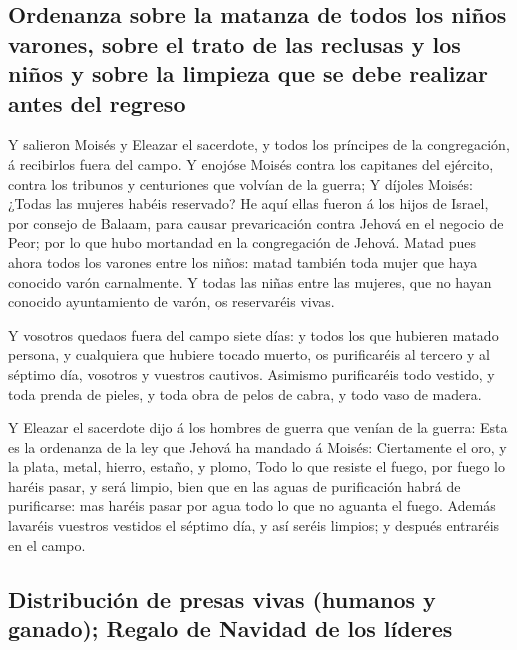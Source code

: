 \hypertarget{ordenanza-sobre-la-matanza-de-todos-los-niuxf1os-varones-sobre-el-trato-de-las-reclusas-y-los-niuxf1os-y-sobre-la-limpieza-que-se-debe-realizar-antes-del-regreso}{%
\subsection{Ordenanza sobre la matanza de todos los niños varones, sobre
el trato de las reclusas y los niños y sobre la limpieza que se debe
realizar antes del
regreso}\label{ordenanza-sobre-la-matanza-de-todos-los-niuxf1os-varones-sobre-el-trato-de-las-reclusas-y-los-niuxf1os-y-sobre-la-limpieza-que-se-debe-realizar-antes-del-regreso}}

 Y salieron Moisés y Eleazar el sacerdote, y todos los
príncipes de la congregación, á recibirlos fuera del campo.
 Y enojóse Moisés contra los capitanes del ejército,
contra los tribunos y centuriones que volvían de la guerra;
 Y díjoles Moisés: ¿Todas las mujeres habéis reservado?
 He aquí ellas fueron á los hijos de Israel, por consejo
de Balaam, para causar prevaricación contra Jehová en el negocio de
Peor; por lo que hubo mortandad en la congregación de Jehová.
 Matad pues ahora todos los varones entre los niños:
matad también toda mujer que haya conocido varón carnalmente.
 Y todas las niñas entre las mujeres, que no hayan
conocido ayuntamiento de varón, os reservaréis vivas.

 Y vosotros quedaos fuera del campo siete días: y todos
los que hubieren matado persona, y cualquiera que hubiere tocado muerto,
os purificaréis al tercero y al séptimo día, vosotros y vuestros
cautivos.  Asimismo purificaréis todo vestido, y toda
prenda de pieles, y toda obra de pelos de cabra, y todo vaso de madera.

 Y Eleazar el sacerdote dijo á los hombres de guerra que
venían de la guerra: Esta es la ordenanza de la ley que Jehová ha
mandado á Moisés:  Ciertamente el oro, y la plata, metal,
hierro, estaño, y plomo,  Todo lo que resiste el fuego,
por fuego lo haréis pasar, y será limpio, bien que en las aguas de
purificación habrá de purificarse: mas haréis pasar por agua todo lo que
no aguanta el fuego.  Además lavaréis vuestros vestidos
el séptimo día, y así seréis limpios; y después entraréis en el campo.

\hypertarget{distribuciuxf3n-de-presas-vivas-humanos-y-ganado-regalo-de-navidad-de-los-luxedderes}{%
\subsection{Distribución de presas vivas (humanos y ganado); Regalo de
Navidad de los
líderes}\label{distribuciuxf3n-de-presas-vivas-humanos-y-ganado-regalo-de-navidad-de-los-luxedderes}}

